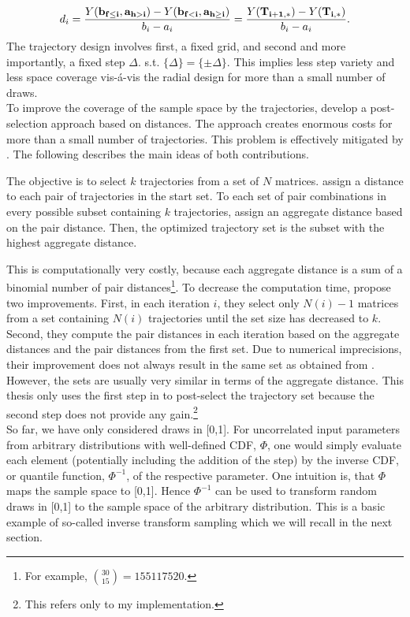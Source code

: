 \documentclass[a4paper,12pt]{article}
\begin{document}
\begin{align} \label{eq:traj}
d_i =  \frac{Y(\bold{b_{f \leq i}}, \bold{a_{h>i}}) - Y(\bold{b_{f<i}}, \bold{a_{h \geq i}})}{b_i - a_i} = \frac{Y(\bold{T_{i+1,*})} -  Y(\bold{T_{i,*}})}{b_i - a_i}.
\end{align}
The trajectory design involves first, a fixed grid, and second and more importantly, a fixed step $\Delta$. s.t. $\{\Delta\} = \{\pm \Delta\}$. This implies less step variety and less space coverage vis-á-vis the radial design for more than a small number of draws.\\

\noindent
To improve the coverage of the sample space by the trajectories, \cite{campolongo2007effective} develop a post-selection approach based on distances. The approach creates enormous costs for more than a small number of trajectories. This problem is effectively mitigated by \cite{ge2014efficient}. The following describes the main ideas of both contributions.

The objective is to select $k$ trajectories from a set of $N$ matrices. \cite{campolongo2007effective} assign a distance to each pair of trajectories in the start set. To each set of pair combinations in every possible subset containing $k$ trajectories, \citeauthor{campolongo2007effective} assign an aggregate distance based on the pair distance. Then, the optimized trajectory set is the subset with the highest aggregate distance.

This is computationally very costly, because each aggregate distance is a sum of a binomial number of pair distances\footnote{For example, $\binom{30}{15} = 155117520$.}. To decrease the computation time, \cite{ge2014efficient} propose two improvements. First, in each iteration $i$, they select only $N(i)-1$ matrices from a set containing $N(i)$ trajectories until the set size has decreased to $k$. Second, they compute the pair distances in each iteration based on the aggregate distances and the pair distances from the first set. Due to numerical imprecisions, their improvement does not always result in the same set as obtained from \cite{campolongo2007effective}. However, the sets are usually very similar in terms of the aggregate distance. This thesis only uses the first step in \cite{ge2014efficient} to post-select the trajectory set because the second step does not provide any gain.\footnote{This refers only to my implementation.}\\


\noindent
So far, we have only considered draws in [0,1]. For uncorrelated input parameters from arbitrary distributions with well-defined CDF, $\Phi$, one would simply evaluate each element (potentially including the addition of the step) by the inverse CDF, or quantile function, $\Phi^{-1}$, of the respective parameter. One intuition is, that $\Phi$ maps the sample space to [0,1]. Hence $\Phi^{-1}$ can be used to transform random draws in [0,1] to the sample space of the arbitrary distribution. This is a basic example of so-called inverse transform sampling which we will recall in the next section.
\end{document}
